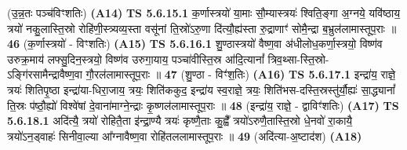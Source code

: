 \documentclass[17pt]{extarticle}
\begin{document}
                  \newline
                      (उ॒न्न॒तः पञ्च॑विꣳशतिः)  \textbf{(A14)} \newline \newline
                                        \textbf{ TS 5.6.15.1} \newline
                  क॒र्णास्त्रयो॑ या॒माः सौ॒म्यास्त्रयः॑ श्विति॒ङ्गा अ॒ग्नये॒ यवि॑ष्ठाय॒ त्रयो॑ नकु॒लास्ति॒स्रो रोहि॑णी॒स्त्र्यव्य॒स्ता वसू॑नां ति॒स्रो॑ऽरु॒णा दि॑त्यौ॒ह्य॑स्ता रु॒द्राणाꣳ॑ सोमै॒न्द्रा ब॒भ्रुल॑लामास्तूप॒राः ॥ \textbf{  46} \newline
                  \newline
                      (क॒र्णास्त्रयो॑ - विꣳशतिः)  \textbf{(A15)} \newline \newline
                                        \textbf{ TS 5.6.16.1} \newline
                  शु॒ण्ठास्त्रयो॑ वैष्ण॒वा अ॑धीलोध॒कर्णा॒स्त्रयो॒ विष्ण॑व उरुक्र॒माय॑ लफ्सु॒दिन॒स्त्रयो॒ विष्ण॑व उरुगा॒याय॒ पञ्चा॑वीस्ति॒स्र आ॑दि॒त्यानां᳚ त्रिव॒थ्सा-स्ति॒स्रो-ऽङ्गि॑रसामैन्द्रावैष्ण॒वा गौ॒रल॑लामास्तूप॒राः ॥ \textbf{  47} \newline
                  \newline
                      (शु॒ण्ठा - विꣳ॑श॒तिः)  \textbf{(A16)} \newline \newline
                                        \textbf{ TS 5.6.17.1} \newline
                  इन्द्रा॑य॒ राज्ञे॒ त्रयः॑ शितिपृ॒ष्ठा इन्द्रा॑या-धिरा॒जाय॒ त्रयः॒ शिति॑ककुद॒ इन्द्रा॑य स्व॒राज्ञे॒ त्रयः॒ शिति॑भस-दस्ति॒स्रस्तु॑र्यौ॒ह्यः॑ सा॒द्ध्यानां᳚ ति॒स्रः प॑ष्ठौ॒ह्यो॑ विश्वे॑षां दे॒वाना॑माग्ने॒न्द्राः कृ॒ष्णल॑लामास्तूप॒राः ॥ \textbf{  48} \newline
                  \newline
                      (इन्द्रा॑य॒ राज्ञे॒ - द्वाविꣳ॑शतिः)  \textbf{(A17)} \newline \newline
                                        \textbf{ TS 5.6.18.1} \newline
                  अदि॑त्यै॒ त्रयो॑ रोहितै॒ता इ॑न्द्रा॒ण्यै त्रयः॑ कृष्णै॒ताः कु॒ह्वै᳚ त्रयो॑ऽरुणै॒तास्ति॒स्रो धे॒नवो॑ रा॒कायै॒ त्रयो॑ऽन॒ड्वाहः॑ सिनीवा॒ल्या आ᳚ग्नावैष्ण॒वा रोहि॑तललामास्तूप॒राः ॥ \textbf{  49 } \newline
                  \newline
                      (अदि॑त्या-अ॒ष्टाद॑श)  \textbf{(A18)} \newline \newline
\end{document}
